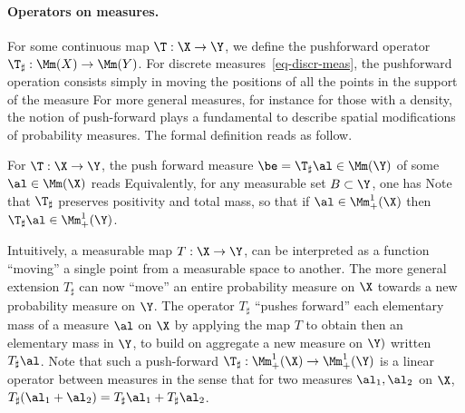 \paragraph{Operators on measures.}


For some continuous map $\T : \X \rightarrow \Y$, we define the pushforward operator $\T_\sharp : \Mm(X) \rightarrow \Mm(Y)$. 
%
For discrete measures~\eqref{eq-discr-meas}, the pushforward operation consists simply in moving the positions of all the points in the support of the measure
For more general measures, for instance for those with a density, the notion of push-forward plays a fundamental to describe spatial modifications of probability measures. The formal definition reads as follow.

\begin{defn}\label{defn-pushfwd}
For $\T : \X \rightarrow \Y$, the push forward measure $\be = \T_\sharp \al \in \Mm(\Y)$ of some $\al \in \Mm(\X)$ reads
Equivalently, for any measurable set $B \subset \Y$, one has
Note that $\T_\sharp$ preserves positivity and total mass, so that if $\al \in \Mm_+^1(\X)$ then $\T_\sharp \al \in \Mm_+^1(\Y)$. 
\end{defn}

Intuitively, a measurable map $T: \X\rightarrow \Y$, can be interpreted as a function ``moving'' a single point from a measurable space to another. The more general extension $T_\sharp$ can now ``move'' an entire probability measure on $\X$ towards a new probability measure on $\Y$. The operator $T_\sharp$ ``pushes forward'' each elementary mass of a measure $\al$ on $\X$ by applying the map $T$ to obtain then an elementary mass in $\Y$, to build on aggregate a new measure on $\Y)$ written $T_{\sharp}\al$.  Note that such a push-forward $\T_\sharp : \Mm_+^1(\X) \rightarrow \Mm_+^1(\Y)$ is a linear operator between measures in the sense that for two measures $\al_1,\al_2$ on $\X$, $T_\sharp(\al_1+\al_2)=T_\sharp\al_1+ T_\sharp\al_2$.




